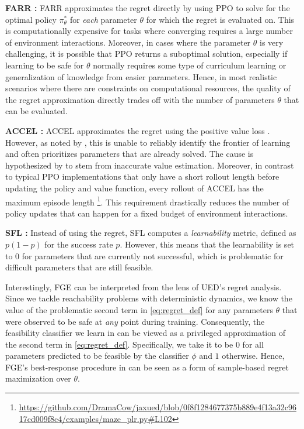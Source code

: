 \documentclass{article} %
\let\Cref\crtCref
\newcommand{\AlgOursAbrv}{FGE}
\newcommand{\AlgOurs}{\textcolor{MaterialBlue900}{\small\textsf{\AlgOursAbrv{}}}}
\newcommand{\AlgACCEL}{\textcolor{MaterialPurple900}{\small\textsf{ACCEL}}}
\newcommand{\AlgFARR}{\textcolor{MaterialPurple900}{\small\textsf{FARR}}}
\newcommand{\AlgSFL}{\textcolor{MaterialPurple900}{\small\textsf{SFL}}}
\begin{document}
\noindent\textbf{\AlgFARR{} \citep{lanier_feasible_2022}: } \AlgFARR{} approximates the regret directly by using PPO to solve for the optimal policy $\pi^*_\theta$ for \textit{each} parameter $\theta$ for which the regret is evaluated on. This is computationally expensive for tasks where converging requires a large number of environment interactions. Moreover, in cases where the parameter $\theta$ is very challenging, it is possible that PPO returns a suboptimal solution, especially if learning to be safe for $\theta$ normally requires some type of curriculum learning or generalization of knowledge from easier parameters. Hence, in most realistic scenarios where there are constraints on computational resources, the quality of the regret approximation directly trades off with the number of parameters $\theta$ that can be evaluated.

\noindent\textbf{\AlgACCEL{} \citep{parker2022evolving}: } \AlgACCEL{} approximates the regret using the positive value loss \citep{rutherford_no_nodate}. However, as noted by \citet{rutherford_no_nodate}, this is unable to reliably identify the frontier of learning and often prioritizes parameters that are already solved. The cause is hypothesized by \citet{rutherford_no_nodate} to stem from inaccurate value estimation.
Moreover, in contrast to typical PPO implementations that only have a short rollout length before updating the policy and value function, every rollout of \AlgACCEL{} has the maximum episode length
\footnote{\url{https://github.com/DramaCow/jaxued/blob/0f8f1284677375b889e4f13a32c9617cd009f8c4/examples/maze_plr.py\#L102}}.
This requirement drastically reduces the number of policy updates that can happen for a fixed budget of environment interactions.

\noindent\textbf{\AlgSFL{} \citep{rutherford_no_nodate}: } Instead of using the regret, \AlgSFL{} computes a \textit{learnability} metric, defined as $p(1-p)$ for the success rate $p$. However, this means that the learnability is set to $0$ for parameters that are currently not successful, which is problematic for difficult parameters that are still feasible. 

Interestingly, \AlgOurs{} can be interpreted from the lens of UED's regret analysis.
Since we tackle reachability problems with deterministic dynamics, we know the value of the problematic second term in \eqref{eq:regret_def} for any parameters $\theta$ that were observed to be safe at \textit{any} point during training.
Consequently, the feasibility classifier we learn in \Cref{sec:classifier} can be viewed as a privileged approximation of the second term in \eqref{eq:regret_def}.
Specifically, we take it to be $0$ for all parameters predicted to be feasible by the classifier $\phi$ and $1$ otherwise.
Hence, \AlgOurs{}'s best-response procedure in \Cref{subsec:saddlepoint} can be seen as a form of sample-based regret maximization over $\theta$.
\end{document}

